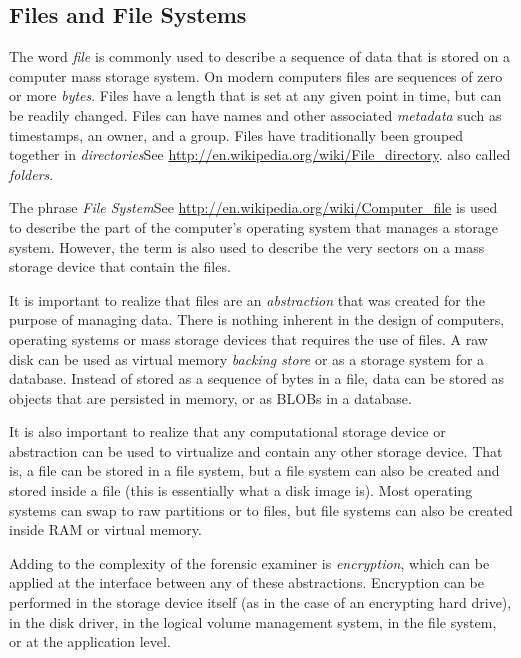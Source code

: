 \documentclass[11pt,letter]{book}
\newcommand{\wikipedia}[1]{See \url{#1}}
\begin{document}
\subsection{Files and File Systems}
The word \emph{file} is commonly used to describe a sequence of data
that is stored on a computer mass storage system. On modern computers
files are sequences of zero or more \emph{bytes}. Files have a length
that is set at any given point in time, but can be readily
changed. Files can have names and other associated \emph{metadata}
such as timestamps, an owner, and a group. Files have traditionally
been grouped together in
\emph{directories}\wikipedia{http://en.wikipedia.org/wiki/File_directory}. also
called \emph{folders}. 

The phrase \emph{File
  System}\wikipedia{http://en.wikipedia.org/wiki/Computer_file} is
used to describe the part of the computer's operating
system that manages a storage system. However, the term is also used
to describe the very sectors on a mass storage device that contain the
files.

It is important to realize that files are an \emph{abstraction} that
was created for the purpose of managing data. There is nothing
inherent in the design of computers, operating systems or mass storage
devices that requires the use of files. A raw disk can be used as
virtual memory \emph{backing store} or as a storage system for a
database. Instead of stored as a sequence of bytes in a file, data can be stored as
objects that are persisted in memory, or as BLOBs in a database.

It is also important to realize that any computational storage device
or abstraction can be used to virtualize and contain any other storage
device. That is, a file can be stored in a file system, but a file
system can also be created and stored inside a file (this is
essentially what a disk image is). Most operating systems can swap to raw
partitions or to files, but file systems can also be created inside
RAM or virtual memory.

Adding to the complexity of the forensic examiner is
\emph{encryption}, which can be applied at the interface between any
of these abstractions. Encryption can be performed in the storage
device itself (as in the case of an encrypting hard drive), in the
disk driver, in the logical volume management system, in the file
system, or at the application level.
\end{document}
